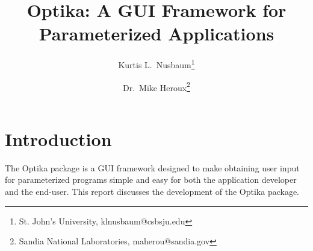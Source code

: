 \documentclass{csri10}
\title{Optika: A GUI Framework for Parameterized Applications}
\author{Kurtis L.\ Nusbaum\thanks{St. John's University, klnusbaum@csbsju.edu} \and Dr.\ Mike Heroux\thanks{Sandia National Laboratories,
maherou@sandia.gov}}
\begin{document}
\maketitle

\begin{abstract}

\end{abstract}

\section{Introduction} \label{KLN:sec:intro}
The Optika package is a GUI framework designed to make obtaining user input for parameterized programs simple and easy 
for both the application developer and the end-user. This report discusses the development of the Optika package. 



%
\end{document}
